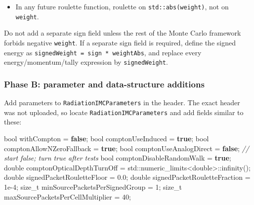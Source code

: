 \documentclass[
]{article}
\newenvironment{Shaded}{}{}
\newcommand{\BuiltInTok}[1]{\textcolor[rgb]{0.00,0.50,0.00}{#1}}
\newcommand{\CommentTok}[1]{\textcolor[rgb]{0.38,0.63,0.69}{\textit{#1}}}
\newcommand{\DataTypeTok}[1]{\textcolor[rgb]{0.56,0.13,0.00}{#1}}
\newcommand{\DecValTok}[1]{\textcolor[rgb]{0.25,0.63,0.44}{#1}}
\newcommand{\FloatTok}[1]{\textcolor[rgb]{0.25,0.63,0.44}{#1}}
\newcommand{\KeywordTok}[1]{\textcolor[rgb]{0.00,0.44,0.13}{\textbf{#1}}}
\newcommand{\NormalTok}[1]{#1}
\newcommand{\OperatorTok}[1]{\textcolor[rgb]{0.40,0.40,0.40}{#1}}
\providecommand{\tightlist}{%
  \setlength{\itemsep}{0pt}\setlength{\parskip}{0pt}}
\begin{document}
\begin{itemize}
\tightlist
\item
  In any future roulette function, roulette on
  \texttt{std::abs(weight)}, not on \texttt{weight}.
\end{itemize}

Do not add a separate sign field unless the rest of the Monte Carlo
framework forbids negative \texttt{weight}. If a separate sign field is
required, define the signed energy as
\texttt{signedWeight\ =\ sign\ *\ weightAbs}, and replace every
energy/momentum/tally expression by \texttt{signedWeight}.

\subsubsection{Phase B: parameter and data-structure
additions}\label{phase-b-parameter-and-data-structure-additions}

Add parameters to \texttt{RadiationIMCParameters} in the header. The
exact header was not uploaded, so locate \texttt{RadiationIMCParameters}
and add fields similar to these:

\begin{Shaded}
\begin{Highlighting}[]
\DataTypeTok{bool}\NormalTok{ withCompton }\OperatorTok{=} \KeywordTok{false}\OperatorTok{;}
\DataTypeTok{bool}\NormalTok{ comptonUseInduced }\OperatorTok{=} \KeywordTok{true}\OperatorTok{;}
\DataTypeTok{bool}\NormalTok{ comptonAllowNZeroFallback }\OperatorTok{=} \KeywordTok{true}\OperatorTok{;}
\DataTypeTok{bool}\NormalTok{ comptonUseAnalogDirect }\OperatorTok{=} \KeywordTok{false}\OperatorTok{;}  \CommentTok{// start false; turn true after tests}
\DataTypeTok{bool}\NormalTok{ comptonDisableRandomWalk }\OperatorTok{=} \KeywordTok{true}\OperatorTok{;}
\DataTypeTok{double}\NormalTok{ comptonOpticalDepthTurnOff }\OperatorTok{=} \BuiltInTok{std::}\NormalTok{numeric\_limits}\OperatorTok{\textless{}}\DataTypeTok{double}\OperatorTok{\textgreater{}::}\NormalTok{infinity}\OperatorTok{();}
\DataTypeTok{double}\NormalTok{ signedPacketRouletteFloor }\OperatorTok{=} \FloatTok{0.0}\OperatorTok{;}
\DataTypeTok{double}\NormalTok{ signedPacketRouletteFraction }\OperatorTok{=} \FloatTok{1e{-}4}\OperatorTok{;}
\DataTypeTok{size\_t}\NormalTok{ minSourcePacketsPerSignedGroup }\OperatorTok{=} \DecValTok{1}\OperatorTok{;}
\DataTypeTok{size\_t}\NormalTok{ maxSourcePacketsPerCellMultiplier }\OperatorTok{=} \DecValTok{40}\OperatorTok{;}
\end{Highlighting}
\end{Shaded}
\end{document}
